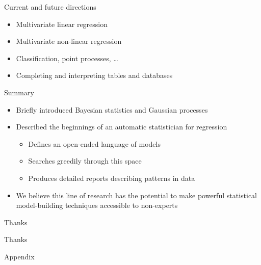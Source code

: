 \begin{frame}{Current and future directions}
  \begin{itemize}
    \item Multivariate linear regression
    \vspace{\baselineskip}
    \item Multivariate non-linear regression
    \vspace{\baselineskip}
    \item Classification, point processes, \dots
    \vspace{\baselineskip}
    \item Completing and interpreting tables and databases
    \vspace{\baselineskip}
  \end{itemize}
\end{frame}

\begin{frame}{Summary}
  \begin{itemize}
    \item Briefly introduced Bayesian statistics and Gaussian processes
    \vspace{\baselineskip}
    \item Described the beginnings of an automatic statistician for regression
    \begin{itemize}
      \item Defines an open-ended language of models
      \item Searches greedily through this space
      \item Produces detailed reports describing patterns in data
    \end{itemize}
    \vspace{\baselineskip}
    \item We believe this line of research has the potential to make powerful statistical model-building techniques accessible to non-experts
  \end{itemize}
\end{frame}

\begin{frame}{Thanks}
  \begin{center}
  \Huge
  Thanks
  \end{center}
\end{frame}

\begin{frame}{Appendix}
\end{frame}

